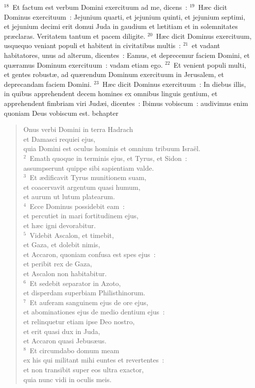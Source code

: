 ${}^{18}$~Et factum est verbum Domini exercituum ad me, dicens~:
${}^{19}$~H\ae c dicit Dominus exercituum~: Jejunium quarti, et jejunium quinti, et jejunium septimi, et jejunium decimi erit domui Juda in gaudium et l\ae titiam et in solemnitates pr\ae claras. Veritatem tantum et pacem diligite.
${}^{20}$~H\ae c dicit Dominus exercituum, usquequo veniant populi et habitent in civitatibus multis~:
${}^{21}$~et vadant habitatores, unus ad alterum, dicentes~: Eamus, et deprecemur faciem Domini, et qu\ae ramus Dominum exercituum~: vadam etiam ego.
${}^{22}$~Et venient populi multi, et gentes robust\ae , ad qu\ae rendum Dominum exercituum in Jerusalem, et deprecandam faciem Domini.
${}^{23}$~H\ae c dicit Dominus exercituum~: In diebus illis, in quibus apprehendent decem homines ex omnibus linguis gentium, et apprehendent fimbriam viri Jud\ae i, dicentes~: Ibimus vobiscum~: audivimus enim quoniam Deus vobiscum est.
bchapter\begin{flushleft}\begin{verse}\vspace{-19pt}Onus verbi Domini in terra Hadrach\\ et Damasci requiei ejus,\\ quia Domini est oculus hominis et omnium tribuum Isra\"el.\\
${}^{2}$~Emath quoque in terminis ejus, et Tyrus, et Sidon~:\\ assumpserunt quippe sibi sapientiam valde.\\
${}^{3}$~Et \ae dificavit Tyrus munitionem suam,\\ et coacervavit argentum quasi humum,\\ et aurum ut lutum platearum.\\
${}^{4}$~Ecce Dominus possidebit eam~:\\ et percutiet in mari fortitudinem ejus,\\ et h\ae c igni devorabitur.\\
${}^{5}$~Videbit Ascalon, et timebit,\\ et Gaza, et dolebit nimis,\\ et Accaron, quoniam confusa est spes ejus~:\\ et peribit rex de Gaza,\\ et Ascalon non habitabitur.\\
${}^{6}$~Et sedebit separator in Azoto,\\ et disperdam superbiam Philisthinorum.\\
${}^{7}$~Et auferam sanguinem ejus de ore ejus,\\ et abominationes ejus de medio dentium ejus~:\\ et relinquetur etiam ipse Deo nostro,\\ et erit quasi dux in Juda,\\ et Accaron quasi Jebus\ae us.\\
${}^{8}$~Et circumdabo domum meam\\ ex his qui militant mihi euntes et revertentes~:\\ et non transibit super eos ultra exactor,\\ quia nunc vidi in oculis meis.\end{verse}\end{flushleft}


